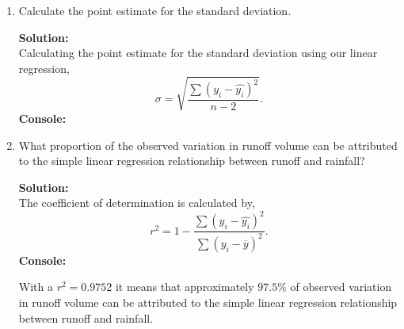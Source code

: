 \documentclass[12pt]{article}
\makeatletter
\theoremstyle{homework}
\newenvironment{exercise}[1]
{\def\@currentlabel{#1}\exercisecore}
{\endexercisecore}
\newcommand{\localhead}[1]{\par\smallskip\noindent\textbf{#1}\nobreak\\}%
\newcommand\solution{\localhead{Solution:}}
\makeatother
\begin{document}
\begin{exercise}{12.16}
\begin{enumerate}
    \item Calculate the point estimate for the standard deviation.\\
    \solution Calculating the point estimate for the standard deviation using our linear regression,
    \begin{equation*}
      \sigma = \sqrt{\dfrac{\sum(y_i - \hat{y_i})^2}{n-2}}.
    \end{equation*}
    \textbf{Console:}
    \begin{center}
    
    \end{center}
    \vspace{.25in}

    \item What proportion of the observed variation in runoff volume can be attributed to the simple linear
    regression relationship between runoff and rainfall?\\
    \solution The coefficient of determination is calculated by,
    \begin{equation*}
      r^2 = 1 -  \dfrac{\sum(y_i - \hat{y_i})^2}{\sum(y_i - \overline{y})^2}.
    \end{equation*}
    \textbf{Console:}
    \begin{center}
    
    \end{center}
    With a $r^2 = 0.9752$ it means that approximately $97.5\%$ of observed variation in runoff volume can be 
    attributed to the simple linear regression relationship between runoff and rainfall.
  \end{enumerate}
\end{exercise}
\vspace{.5in}
\end{document}
